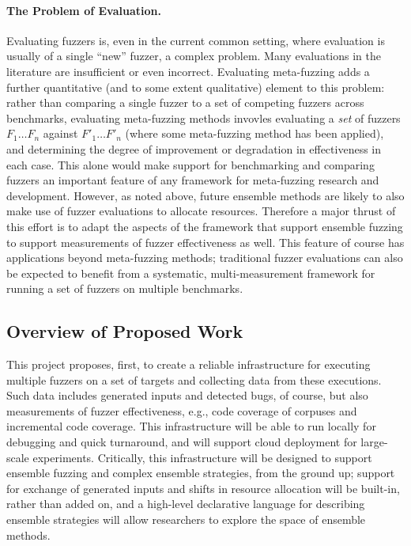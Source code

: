 \documentclass[numbers]{proposalnsf}
\begin{document}
\paragraph{The Problem of Evaluation.} Evaluating fuzzers is, even in the current common setting, where evaluation is usually of a single ``new'' fuzzer, a complex problem. Many evaluations in the literature are insufficient or even incorrect.  Evaluating meta-fuzzing adds a further quantitative (and to some extent qualitative) element to this problem: rather than comparing a single fuzzer to a set of competing fuzzers across benchmarks, evaluating meta-fuzzing methods invovles evaluating a \emph{set} of fuzzers $F_1 \ldots F_n$ against $F'_1 \ldots F'_n$ (where some meta-fuzzing method has been applied), and determining the degree of improvement or degradation in effectiveness in each case.  This alone would make support for benchmarking and comparing fuzzers an important feature of any framework for meta-fuzzing research and development.  However, as noted above, future ensemble methods are likely to also make use of fuzzer evaluations to allocate resources.  Therefore a major thrust of this effort is to adapt the aspects of the framework that support ensemble fuzzing to support measurements of fuzzer effectiveness as well.  This feature of course has applications beyond meta-fuzzing methods; traditional fuzzer evaluations can also be expected to benefit from a systematic, multi-measurement framework for running a set of fuzzers on multiple benchmarks.

\subsection{Overview of Proposed Work}

This project proposes, first, to create a reliable infrastructure for executing multiple fuzzers on a set of targets and collecting data from these executions.  Such data includes generated inputs and detected bugs, of course, but also measurements of fuzzer effectiveness, e.g., code coverage of corpuses and incremental code coverage.  This infrastructure will be able to run locally for debugging and quick turnaround, and will support cloud deployment for large-scale experiments. Critically, this infrastructure will be designed to support ensemble fuzzing and complex ensemble strategies, from the ground up; support for exchange of generated inputs and shifts in resource allocation will be built-in, rather than added on, and a high-level declarative language for describing ensemble strategies will allow researchers to explore the space of ensemble methods.
\end{document}
